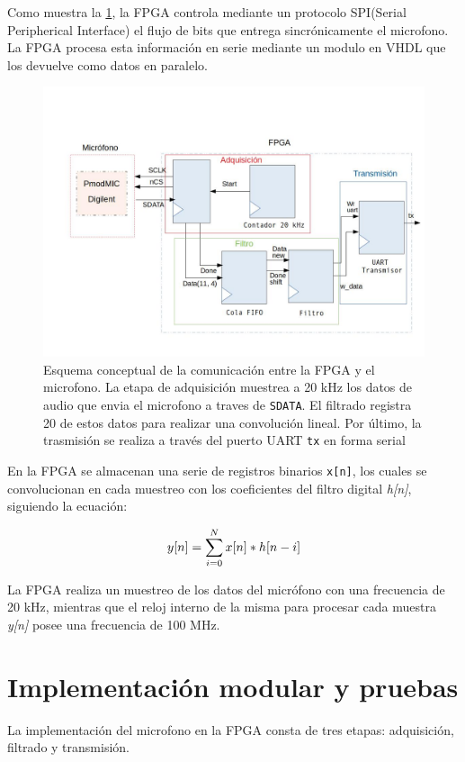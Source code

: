 \documentclass[12pt,letterpaper]{article}
\begin{document}
Como muestra la \ref{fig:conceptual}, la FPGA controla mediante un protocolo SPI(Serial Peripherical Interface) el flujo de bits que entrega sincrónicamente el microfono. La FPGA procesa esta información en serie mediante un modulo en VHDL que los devuelve como datos en paralelo. 

\begin{figure}[H]
    \centering
    \includegraphics[width=0.7\linewidth]{conceptual.jpg}
    \caption{Esquema conceptual de la comunicación entre la FPGA y el microfono. La etapa de adquisición muestrea a 20 kHz los datos de audio que envia el microfono a traves de \texttt{SDATA}. El filtrado registra 20 de estos datos para realizar una convolución lineal. Por último, la trasmisión se realiza a través del puerto UART \texttt{tx} en forma serial}
    \label{fig:conceptual}
\end{figure}

En la FPGA se almacenan una serie de registros binarios \texttt{x[n]}, los cuales se convolucionan en cada muestreo con los coeficientes del filtro digital \textit{h[n]}, siguiendo la ecuación:

\begin{equation}
\centering
y[n]=\sum_{i=0}^{N}x[n]*h[n-i] 
    
\end{equation}

La FPGA realiza un muestreo de los datos del micrófono con una frecuencia de 20 kHz, mientras que el reloj interno de la misma para procesar cada muestra \textit{y[n]} posee una frecuencia de 100 MHz. 

\section{Implementación modular y pruebas}

La implementación del microfono en la FPGA consta de tres etapas: adquisición, filtrado y transmisión.
\end{document}
